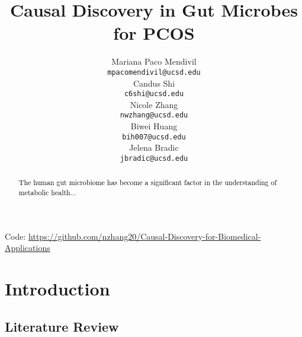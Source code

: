 \documentclass[12pt,letterpaper]{article}
\title{Causal Discovery in Gut Microbes for PCOS}
\author{Mariana Paco Mendivil \\
  {\tt mpacomendivil@ucsd.edu} \\\And
  Candus Shi \\
  {\tt c6shi@ucsd.edu} \\\And
  Nicole Zhang \\
  {\tt nwzhang@ucsd.edu} \\\And
  Biwei Huang \\
  {\tt bih007@ucsd.edu} \\\And
  Jelena Bradic \\
  {\tt jbradic@ucsd.edu}}
\begin{document}
\maketitle



\begin{abstract}
    \textcolor{black}{
    The human gut microbiome has become a significant factor in the understanding of metabolic health...}
\end{abstract}

\begin{center}

Code: \url{https://github.com/nzhang20/Causal-Discovery-for-Biomedical-Applications}
\end{center}

\maketoc
\clearpage


\section{Introduction}

\subsection{Literature Review}
\end{document}
